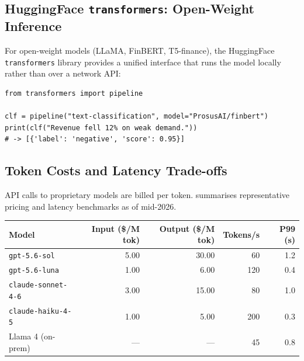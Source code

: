 \begin{deepdive}
\subsection{HuggingFace \texttt{transformers}: Open-Weight Inference}
\label{sec:api-huggingface}

For open-weight models (LLaMA, FinBERT, T5-finance), the HuggingFace
\texttt{transformers} library provides a unified interface that runs the model locally
rather than over a network API:

\begin{verbatim}
from transformers import pipeline

clf = pipeline("text-classification", model="ProsusAI/finbert")
print(clf("Revenue fell 12% on weak demand."))
# -> [{'label': 'negative', 'score': 0.95}]
\end{verbatim}

\subsection{Token Costs and Latency Trade-offs}
\label{sec:api-costs}

API calls to proprietary models are billed per token.  
summarises representative pricing and latency benchmarks as of mid-2026.

\begin{center}
  \label{tab:api-costs}
  \small
  \begin{tabular}{lrrrr}
    \toprule
    Model & Input (\$/M tok) & Output (\$/M tok) & Tokens/s & P99 (s) \\
    \midrule
    \texttt{gpt-5.6-sol}    & 5.00 & 30.00 & 60  & 1.2 \\
    \texttt{gpt-5.6-luna}   & 1.00 &  6.00 & 120 & 0.4 \\
    \texttt{claude-sonnet-4-6} & 3.00 & 15.00 & 80  & 1.0 \\
    \texttt{claude-haiku-4-5}  & 1.00 &  5.00 & 200 & 0.3 \\
    Llama 4 (on-prem)      & ---  &  ---  & 45  & 0.8 \\
    \bottomrule
  \end{tabular}
\end{center}


\end{deepdive}
